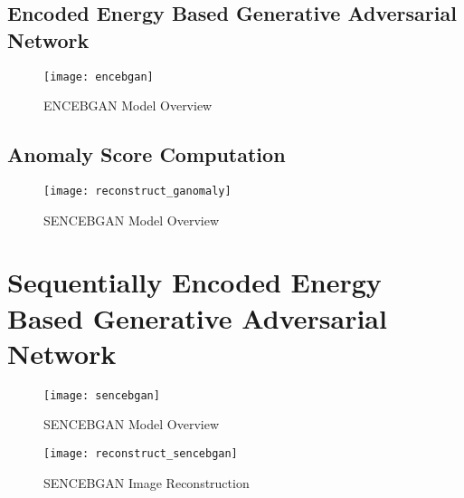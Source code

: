 \subsection{Encoded Energy Based Generative Adversarial Network}
\label{sec:encebgan}

\begin{figure}[h!]
	\centering
	\texttt{[image: encebgan]}
	\caption{ENCEBGAN Model Overview }
	\label{fig:encebgan_model}
\end{figure}

\subsection{Anomaly Score Computation}

\begin{figure}[h!]
	\centering
	\texttt{[image: reconstruct\_ganomaly]}
	\caption{SENCEBGAN Model Overview }
	\label{fig:sencebgan_model}
\end{figure}


\section{Sequentially Encoded Energy Based Generative Adversarial Network}
\label{sec:sencebgan}

\begin{figure}[h!]
	\centering
	\texttt{[image: sencebgan]}
	\caption{SENCEBGAN Model Overview }
	\label{fig:sencebgan_model}
\end{figure}

\begin{figure}[h!]
	\centering
	\texttt{[image: reconstruct\_sencebgan]}
	\caption{SENCEBGAN Image Reconstruction  }
	\label{fig:sencebgan_model}
\end{figure}



\endgroup